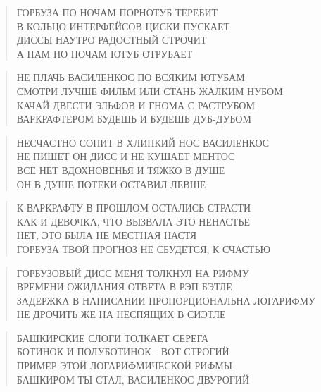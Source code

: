 \poemtitle{***}
\begin{verse}
ГОРБУЗА ПО НОЧАМ ПОРНОТУБ ТЕРЕБИТ\\
В КОЛЬЦО ИНТЕРФЕЙСОВ ЦИСКИ ПУСКАЕТ\\
ДИССЫ НАУТРО РАДОСТНЫЙ СТРОЧИТ\\
А НАМ ПО НОЧАМ ЮТУБ ОТРУБАЕТ
\end{verse}

\poemtitle{***}
\begin{verse}
НЕ ПЛАЧЬ ВАСИЛЕНКОС ПО ВСЯКИМ ЮТУБАМ\\
СМОТРИ ЛУЧШЕ ФИЛЬМ ИЛИ СТАНЬ ЖАЛКИМ НУБОМ\\
КАЧАЙ ДВЕСТИ ЭЛЬФОВ И ГНОМА С РАСТРУБОМ\\
ВАРКРАФТЕРОМ БУДЕШЬ И БУДЕШЬ ДУБ-ДУБОМ
\end{verse}

\poemtitle{***}
\begin{verse}
НЕСЧАСТНО СОПИТ В ХЛИПКИЙ НОС ВАСИЛЕНКОС\\
НЕ ПИШЕТ ОН ДИСС И НЕ КУШАЕТ МЕНТОС\\
ВСЕ НЕТ ВДОХНОВЕНЬЯ И ТЯЖКО В ДУШЕ\\
ОН В ДУШЕ ПОТЕКИ ОСТАВИЛ ЛЕВШЕ
\end{verse}

\poemtitle{***}
\begin{verse}
К ВАРКРАФТУ В ПРОШЛОМ ОСТАЛИСЬ СТРАСТИ\\
КАК И ДЕВОЧКА, ЧТО ВЫЗВАЛА ЭТО НЕНАСТЬЕ\\
НЕТ, ЭТО БЫЛА НЕ МЕСТНАЯ НАСТЯ\\
ГОРБУЗА ТВОЙ ПРОГНОЗ НЕ СБУДЕТСЯ, К СЧАСТЬЮ
\end{verse}

\poemtitle{***}
\begin{verse}
ГОРБУЗОВЫЙ ДИСС МЕНЯ ТОЛКНУЛ НА РИФМУ \\
ВРЕМЕНИ ОЖИДАНИЯ ОТВЕТА В РЭП-БЭТЛЕ\\
ЗАДЕРЖКА В НАПИСАНИИ  ПРОПОРЦИОНАЛЬНА ЛОГАРИФМУ\\
НЕ ДРОЧИТЬ ЖЕ НА НЕСПЯЩИХ В СИЭТЛЕ
\end{verse}

\poemtitle{***}
\begin{verse}
БАШКИРСКИЕ СЛОГИ ТОЛКАЕТ СЕРЕГА\\
БОТИНОК И ПОЛУБОТИНОК - ВОТ СТРОГИЙ\\
ПРИМЕР ЭТОЙ ЛОГАРИФМИЧЕСКОЙ РИФМЫ\\
БАШКИРОМ ТЫ СТАЛ, ВАСИЛЕНКОС ДВУРОГИЙ
\end{verse}

